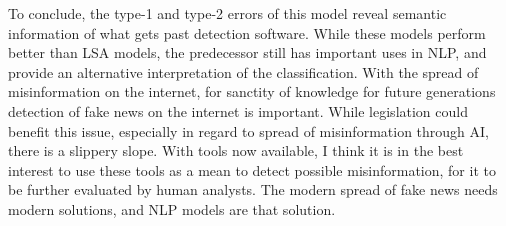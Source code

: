 \documentclass[12pt]{article}
\begin{document}
To conclude, the type-1 and type-2 errors of this model reveal semantic information of what gets past detection software. While these models perform better than LSA models, the predecessor still has important uses in NLP, and provide an alternative interpretation of the classification. With the spread of misinformation on the internet, for sanctity of knowledge for future generations detection of fake news on the internet is important. While legislation could benefit this issue, especially in regard to spread of misinformation through AI, there is a slippery slope. With tools now available, I think it is in the best interest to use these tools as a mean to detect possible misinformation, for it to be further evaluated by human analysts. The modern spread of fake news needs modern solutions, and NLP models are that solution.
\pagebreak

\nocite{*}
\printbibliography
\end{document}
